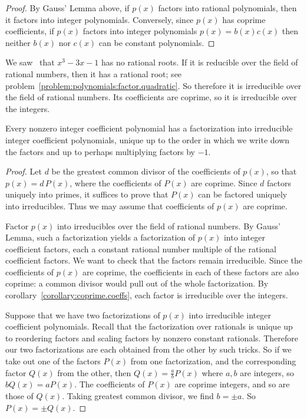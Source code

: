 \begin{proof}
By Gauss' Lemma above, if \(p(x)\) factors into rational polynomials, then it factors into integer polynomials.
Conversely, since \(p(x)\) has coprime coefficients, if \(p(x)\) factors into integer polynomials \(p(x) = b(x)c(x)\) then neither \(b(x)\) nor \(c(x)\) can be constant polynomials. 
\end{proof}
\begin{example}
We saw~ that \(x^3-3x-1\) has no rational roots.
If it is reducible over the field of rational numbers, then it has a rational root; see problem~\vref{problem:polynomials:factor.quadratic}.
So therefore it is irreducible over the field of rational numbers.
Its coefficients are coprime, so it is irreducible over the integers.
\end{example}
\begin{theorem}
Every nonzero integer coefficient polynomial has a factorization into irreducible integer coefficient polynomials, unique up to the order in which we write down the factors and up to perhaps multiplying factors by \(-1\).
\end{theorem}
\begin{proof}
Let \(d\) be the greatest common divisor of the coefficients of \(p(x)\), so that \(p(x) = d \, P(x)\), where the coefficients of \(P(x)\) are coprime. 
Since \(d\) factors uniquely into primes, it suffices to prove that
\(P(x)\) can be factored uniquely into irreducibles. 
Thus we may assume that coefficients of \(p(x)\) are coprime. 

Factor \(p(x)\) into irreducibles over the field of rational numbers.
By Gauss' Lemma, such a factorization yields a factorization of \(p(x)\) into integer coefficient factors, each a constant rational number multiple of the rational coefficient factors. 
We want to check that the factors remain irreducible.
Since the coefficients of \(p(x)\) are coprime, the coefficients in each of these factors are also coprime: a common divisor would pull out of the whole factorization.
By corollary~\vref{corollary:coprime.coeffs}, each factor is irreducible over the integers.

Suppose that we have two factorizations of \(p(x)\) into irreducible integer coefficient polynomials.
Recall that the factorization over rationals is unique up to reordering factors and scaling factors by nonzero constant rationals.
Therefore our two factorizations are each obtained from the other by such tricks.
So if we take out one of the factors \(P(x)\) from one factorization, and the corresponding factor \(Q(x)\) from the other, then \(Q(x)=\frac{a}{b}P(x)\) where \(a, b\) are integers, so \(bQ(x)=aP(x)\).
The coefficients of \(P(x)\) are coprime integers, and so are those of \(Q(x)\).
Taking greatest common divisor, we find \(b = \pm a\).
So \(P(x)=\pm Q(x)\).
\end{proof}
